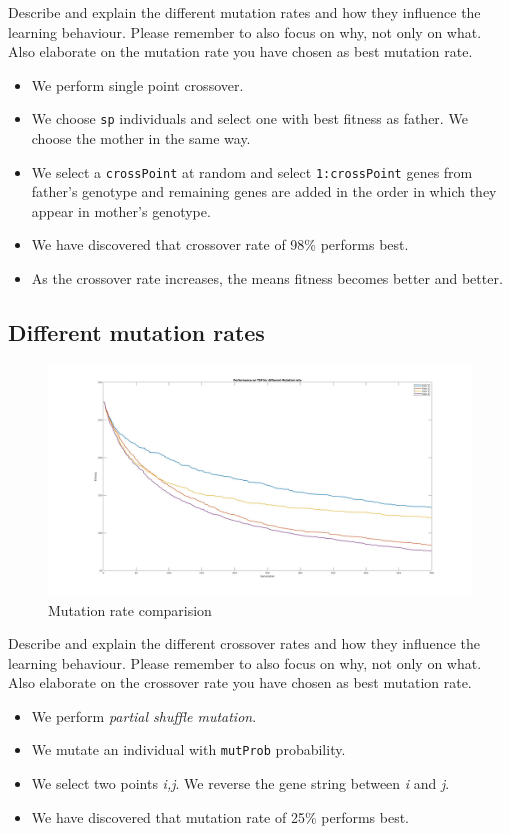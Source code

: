 \documentclass[a4paper, 12pt]{article}
\begin{document}
Describe and explain the different mutation rates and how they influence the learning behaviour. Please remember to also focus on why, not only on what.
Also elaborate on the mutation rate you have chosen as best mutation rate.
\begin{itemize}
    \item We perform single point crossover.
    \item We choose \texttt{sp} individuals and select one with best fitness as father. We choose the mother in the same way.
    \item We select a \texttt{crossPoint} at random and select \texttt{1:crossPoint} genes from father's genotype and remaining genes are added in the order in which they appear in mother's genotype.
    \item We have discovered that crossover rate of 98\% performs best.
    \item As the crossover rate increases, the means fitness becomes better and better.
\end{itemize}

\newpage

\subsection{Different mutation rates}


\begin{figure}[ht!]
  \centering
  \includegraphics[width=1.0\textwidth]{images/mutation_exp_25.jpg}
    \caption{Mutation rate comparision\label{fig:mutfig}}
\end{figure}

Describe and explain the different crossover rates and how they influence the learning behaviour. Please remember to also focus on why, not only on what.
Also elaborate on the crossover rate you have chosen as best mutation rate.
\begin{itemize}
    \item We perform \textit{partial shuffle mutation}.
    \item We mutate an individual with \texttt{mutProb} probability.
    \item We select two points \textit{i,j}. We reverse the gene string between \textit{i} and \textit{j}.
    \item We have discovered that mutation rate of 25\% performs best.
\end{itemize}
\end{document}
